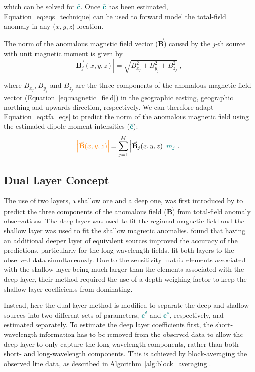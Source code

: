 \noindent
which can be solved for \textcolor{teal}{$\bar{\mathbf{c}}$}. Once \textcolor{teal}{$\bar{\mathbf{c}}$} has been estimated, Equation~\ref{eq:eqs_technique} can be used to forward model the total-field anomaly in any ($x, y, z$) location.


The norm of the anomalous magnetic field vector ($\vec{\mathbf{B}}$) caused by the $j$-th source with unit magnetic moment is given by
\begin{equation}
    \left\lvert \vec{\mathbf{B}_j}(x,y,z) \right\rvert = \sqrt{B^2_{x_j} + B^2_{y_j} +B^2_{z_j}}
    \ ,
\end{equation}

\noindent
where $B_{x_j}$, $B_{y_j}$ and $B_{z_j}$ are the three components of the anomalous magnetic field vector (Equation~\ref{eq:magnetic_field}) in the geographic easting, geographic northing and upwards direction, respectively. We can therefore adapt Equation~\ref{eq:tfa_eqs} to predict the norm of the anomalous magnetic field using the estimated dipole moment intensities (\textcolor{teal}{$\bar{\mathbf{c}}$}):
\begin{equation}
\textcolor{orange}{\left\lvert \vec{\mathbf{B}}(x,y,z) \right\rvert} = \sum_{j=1}^{M}  \left\lvert \vec{\mathbf{B}}_{j}(x,y,z) \right\rvert \textcolor{teal}{m_j}
\ .
\end{equation}


\subsection{Dual Layer Concept}

The use of two layers, a shallow one and a deep one, was first introduced by \citet{Li2020} to predict the three components of the anomalous field ($\vec{\mathbf{B}}$) from total-field anomaly observations. The deep layer was used to fit the regional magnetic field and the shallow layer was used to fit the shallow magnetic anomalies. \citet{Li2020} found that having an additional deeper layer of equivalent sources improved the accuracy of the predictions, particularly for the long‐wavelength fields. \citet{Li2020} fit both layers to the observed data simultaneously. Due to the sensitivity matrix elements associated with the shallow layer being much larger than the elements associated with the deep layer, their method required the use of a depth-weighing factor to keep the shallow layer coefficients from dominating.

Instead, here the dual layer method is modified to separate the deep and shallow sources into two different sets of parameters, \textcolor{teal}{$\bar{\mathbf{c}}^d$} and \textcolor{teal}{$\bar{\mathbf{c}}^s$}, respectively, and estimated separately. To estimate the deep layer coefficients first, the short-wavelength information has to be removed from the observed data to allow the deep layer to only capture the long-wavelength components, rather than both short- and long-wavelength components. This is achieved by block-averaging the observed line data, as described in Algorithm~\ref{alg:block_averaging}.


